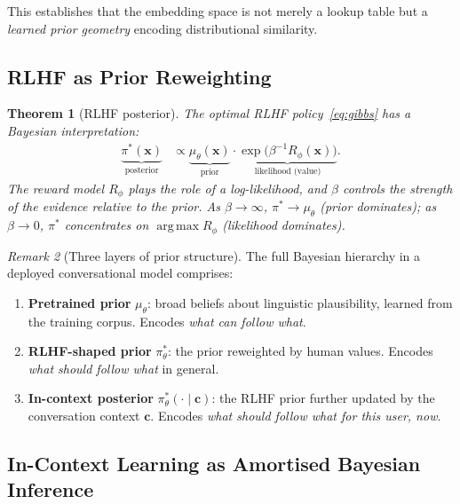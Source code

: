 \documentclass[11pt,a4paper]{article}
\theoremstyle{plain}
\newtheorem{theorem}{Theorem}[section]
\theoremstyle{definition}
\theoremstyle{remark}
\newtheorem{remark}[theorem]{Remark}
\DeclareMathOperator*{\argmax}{arg\,max}
\begin{document}
This establishes that the embedding space is not merely a lookup table but a
\emph{learned prior geometry} encoding distributional similarity.

\subsection{RLHF as Prior Reweighting}

\begin{theorem}[RLHF posterior]\label{thm:rlhf_bayes}
The optimal RLHF policy~\eqref{eq:gibbs} has a Bayesian interpretation:
\begin{align}
  \underbrace{\pi^*(\bm{x})}_{\text{posterior}}
  &\propto
  \underbrace{\mu_\theta(\bm{x})}_{\text{prior}} \cdot
  \underbrace{\exp\!\bigl(\beta^{-1} R_\phi(\bm{x})\bigr)}_{\text{likelihood (value)}}.
  \label{eq:bayes_rlhf}
\end{align}
The reward model $R_\phi$ plays the role of a log-likelihood, and $\beta$
controls the strength of the evidence relative to the prior. As
$\beta \to \infty$, $\pi^* \to \mu_\theta$ (prior dominates); as
$\beta \to 0$, $\pi^*$ concentrates on $\argmax R_\phi$ (likelihood
dominates).
\end{theorem}

\begin{remark}[Three layers of prior structure]
The full Bayesian hierarchy in a deployed conversational model comprises:
\begin{enumerate}[nosep]
  \item \textbf{Pretrained prior} $\mu_\theta$: broad beliefs about linguistic
        plausibility, learned from the training corpus. Encodes \emph{what can
        follow what}.
  \item \textbf{RLHF-shaped prior} $\pi^*_\theta$: the prior reweighted by
        human values. Encodes \emph{what should follow what} in general.
  \item \textbf{In-context posterior} $\pi^*_\theta(\cdot \mid \bm{c})$: the
        RLHF prior further updated by the conversation context $\bm{c}$.
        Encodes \emph{what should follow what for this user, now}.
\end{enumerate}
\end{remark}

\subsection{In-Context Learning as Amortised Bayesian Inference}
\end{document}
